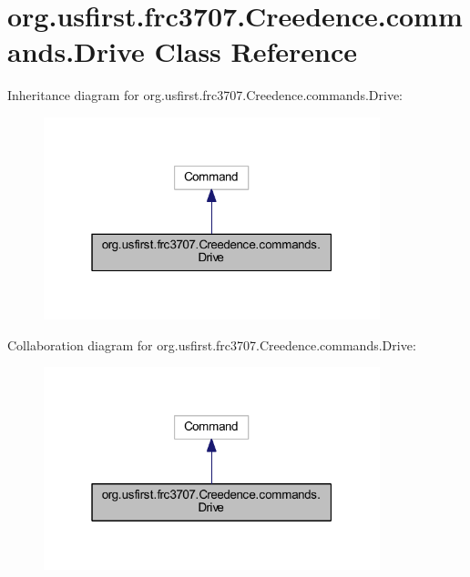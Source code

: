 \hypertarget{classorg_1_1usfirst_1_1frc3707_1_1_creedence_1_1commands_1_1_drive}{}\section{org.\+usfirst.\+frc3707.\+Creedence.\+commands.\+Drive Class Reference}
\label{classorg_1_1usfirst_1_1frc3707_1_1_creedence_1_1commands_1_1_drive}


Inheritance diagram for org.\+usfirst.\+frc3707.\+Creedence.\+commands.\+Drive\+:
\nopagebreak
\begin{figure}[H]
\begin{center}
\leavevmode
\includegraphics[width=277pt]{classorg_1_1usfirst_1_1frc3707_1_1_creedence_1_1commands_1_1_drive__inherit__graph}
\end{center}
\end{figure}


Collaboration diagram for org.\+usfirst.\+frc3707.\+Creedence.\+commands.\+Drive\+:
\nopagebreak
\begin{figure}[H]
\begin{center}
\leavevmode
\includegraphics[width=277pt]{classorg_1_1usfirst_1_1frc3707_1_1_creedence_1_1commands_1_1_drive__coll__graph}
\end{center}
\end{figure}

